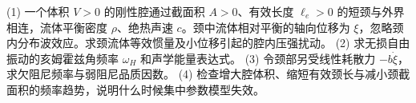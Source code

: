 (1) 一个体积 \(V>0\) 的刚性腔通过截面积 \(A>0\)、有效长度 \(\ell_e>0\) 的短颈与外界相连，流体平衡密度 \(\rho\)、绝热声速 \(c\)。颈中流体相对平衡的轴向位移为 \(\xi\)，忽略颈内分布波效应。求颈流体等效惯量及小位移引起的腔内压强扰动。
(2) 求无损自由振动的亥姆霍兹角频率 \(\omega_H\) 和声学能量表达式。
(3) 令颈部另受线性耗散力 \(-b\dot\xi\)，求欠阻尼频率与弱阻尼品质因数。
(4) 检查增大腔体积、缩短有效颈长与减小颈截面积的频率趋势，说明什么时候集中参数模型失效。
